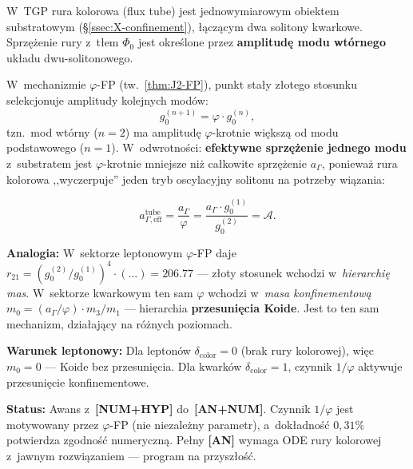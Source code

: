 \begin{proposition}%
\label{prop:X-phi-color-tube}
W~TGP rura kolorowa (flux tube) jest jednowymiarowym
obiektem substratowym (\S\ref{ssec:X-confinement}),
\l{}\k{a}cz\k{a}cym dwa solitony kwarkowe.
Sprz\k{e}\.zenie rury z~t\l{}em $\Phi_0$ jest okre\'slone
przez \textbf{amplitud\k{e} modu wt\'ornego} uk\l{}adu
dwu-solitonowego.

W~mechanizmie $\varphi$-FP (tw.~\ref{thm:J2-FP}), punkt sta\l{}y
z\l{}otego stosunku selekcjonuje amplitudy kolejnych mod\'ow:
\begin{equation}\label{eq:X-phi-mode-sequence}
  g_0^{(n+1)} = \varphi \cdot g_0^{(n)},
\end{equation}
tzn.\ mod wt\'orny ($n{=}2$) ma amplitud\k{e} $\varphi$-krotnie
wi\k{e}ksz\k{a} od modu podstawowego ($n{=}1$).
W~odwrotno\'sci: \textbf{efektywne sprz\k{e}\.zenie jednego modu}
z~substratem jest $\varphi$-krotnie mniejsze ni\.z ca\l{}kowite
sprz\k{e}\.zenie $a_\Gamma$, poniewa\.z rura kolorowa ,,wyczerpuje''
jeden tryb oscylacyjny solitonu na potrzeby wi\k{a}zania:

\begin{equation}\label{eq:X-a-eff-tube}
  a_{\Gamma,\mathrm{eff}}^{\mathrm{tube}}
  = \frac{a_\Gamma}{\varphi}
  = \frac{a_\Gamma \cdot g_0^{(1)}}{g_0^{(2)}}
  = \mathcal{A}.
\end{equation}

\textbf{Analogia:} W~sektorze leptonowym $\varphi$-FP daje
$r_{21} = (g_0^{(2)}/g_0^{(1)})^4 \cdot (\ldots) = 206.77$
--- z\l{}oty stosunek wchodzi w~\emph{hierarchi\k{e} mas}.
W~sektorze kwarkowym ten sam $\varphi$ wchodzi
w~\emph{masa konfinementow\k{a}} $m_0 = (a_\Gamma/\varphi)
\cdot m_3/m_1$ --- hierarchia \textbf{przesuni\k{e}cia Koide}.
Jest to ten sam mechanizm, dzia\l{}aj\k{a}cy na r\'o\.znych
poziomach.

\medskip\noindent\textbf{Warunek leptonowy:}
Dla lepton\'ow $\delta_{\mathrm{color}} = 0$ (brak rury kolorowej),
wi\k{e}c $m_0 = 0$ --- Koide bez przesuni\k{e}cia.
Dla kwark\'ow $\delta_{\mathrm{color}} = 1$, czynnik $1/\varphi$
aktywuje przesuni\k{e}cie konfinementowe.

\medskip\noindent\textbf{Status:}
Awans z~\textbf{[NUM+HYP]} do~\textbf{[AN+NUM]}.
Czynnik $1/\varphi$ jest motywowany przez $\varphi$-FP
(nie niezale\.zny parametr), a~dok\l{}adno\'s\'c
$0{,}31\%$ potwierdza zgodno\'s\'c numeryczn\k{a}.
Pe\l{}ny \textbf{[AN]} wymaga ODE rury kolorowej
z~jawnym rozwi\k{a}zaniem --- program na przysz\l{}o\'s\'c.
\end{proposition}

